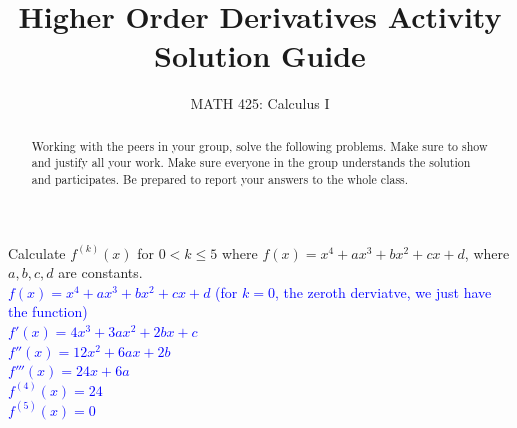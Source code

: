\documentclass{ximera}
\title{Higher Order Derivatives Activity Solution Guide}
\author{MATH 425: Calculus I}
\begin{document}
\begin{abstract}
    Working with the peers in your group, solve the following problems. Make sure to show and justify all your work. Make sure everyone in the group understands the solution and participates. Be prepared to report your answers to the whole class. 
\end{abstract}
\maketitle


\begin{exercise}
    Calculate $f^{(k)}(x)$ for $0<k\leq 5$ where $f(x)=x^4+ax^3+bx^2+cx+d$, where $a,b,c,d$ are constants.\\
    \textcolor{blue}{ $f(x)=x^4+ax^3+bx^2+cx+d$ (for $k=0$, the zeroth derviatve, we just have the function)\\
    $f'(x)=4x^3+3ax^2+2bx+c$\\
    $f''(x)=12x^2+6ax+2b$\\
    $f'''(x)=24x+6a$\\
    $f^{(4)}(x)=24$\\
    $f^{(5)}(x)=0$}
\end{exercise}
\end{document}
